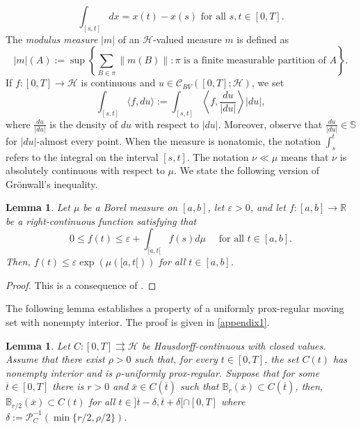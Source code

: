 \documentclass[preprint,12pt]{elsarticle}
\renewcommand{\epsilon}{\varepsilon}
\renewcommand{\H}{\mathcal{H}}
\newcommand{\R}{\mathbb{R}}
\newcommand{\ov}{\overline}
\theoremstyle{plain}
\newtheorem{lemma}[theorem]{Lemma}
\theoremstyle{definition}
\theoremstyle{remark}
\begin{document}
    $$
    \int_{[s,t]} dx = x(t) - x(s)  \textrm{ for all }  s,t \in [0,T].
    $$
    The \textit{modulus measure} \( | m | \) of an \( \H \)-valued measure \( m \) is defined as 
    \[ |m|(A) := \sup\left\{ \sum_{B\in \pi} \|m(B)\| : \pi \text{ is a finite measurable partition of } A \right\}. \]
    If \( f\colon [0,T] \to \H \) is continuous and \( u\in \mathcal{C}_{BV}([0,T];\H) \), we set
    \begin{equation*}
    	\int_{[s,t]} \langle f , du\rangle := \int_{[s,t]} \left\langle f, \frac{du}{|du|}\right\rangle |du|,
    \end{equation*}
    where \( \frac{du}{|du|} \) is the density of \( du \) with respect to \( |du| \). Moreover, observe that \( \frac{du}{|du|}\in \mathbb{S} \) for \( |du| \)-almost every point.  When the measure is nonatomic, the notation \( \int_s^t \) refers to the integral on the interval $[s,t]$. The notation \( \nu \ll \mu \) means that \( \nu \) is absolutely continuous with respect to \( \mu \).	
	We state the following version of Grönwall's inequality.
	\begin{lemma}\label{gronwall-lemma}
		Let $\mu$ be a Borel measure on $[a,b]$, let $\epsilon>0$, and let $f\colon [a,b]\to\R$ be a right-continuous function satisfying that 
		\begin{equation*}
			0\leq f(t)\leq \epsilon + \int_{[a,t[}f(s)d\mu \quad \textrm{ for all } t\in [a,b].
		\end{equation*}
		Then,  $f(t)\leq \epsilon\exp\left(\mu([a,t[)\right)$ for all $t\in [a,b]$.
	\end{lemma} 
	\begin{proof}
		This is a consequence of \cite[Lemma 7.11]{MR4484114}.
	\end{proof}
    
The following lemma establishes a property of a uniformly prox-regular moving set with nonempty interior. The proof is given in \ref{appendix1}. 

    \begin{lemma}\label{lemma_partition}
Let $C\colon [0,T]\rightrightarrows \H$ be Hausdorff-continuous with closed values.
Assume that there exist $\rho>0$ such that, for every $t\in[0,T]$, the set $C(t)$ has nonempty interior and is $\rho$-uniformly prox-regular. Suppose that for some $\ov t\in [0,T]$ there is $r>0$ and $\bar x\in C(\ov t)$ such that $\mathbb{B}_r(\ov x)\subset C(\ov t)$, then, $\mathbb{B}_{r/2}(\ov x)\subset C(t)$ for all $t\in ]\ov t-\delta, \ov t+\delta[\cap [0,T]$ where $\delta := \mathscr{P}_{C}^{-1}(\min\{r/2,\rho/2\})$.
\end{lemma}
\end{document}
